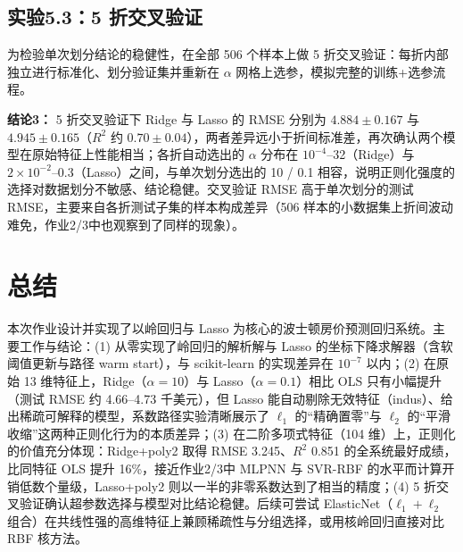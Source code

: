 \documentclass[UTF8,zihao=-4]{ctexart}
\newcommand{\mlExperiment}[2]{\subsection{实验#1：#2}}
\newcommand{\mlConclusion}[1]{\par\noindent\textbf{结论#1：}}
\begin{document}
\mlExperiment{5.3}{5 折交叉验证}
为检验单次划分结论的稳健性，在全部 506 个样本上做 5 折交叉验证：每折内部独立进行标准化、划分验证集并重新在 $\alpha$ 网格上选参，模拟完整的训练+选参流程。

\mlConclusion{3}
5 折交叉验证下 Ridge 与 Lasso 的 RMSE 分别为 $4.884\pm0.167$ 与 $4.945\pm0.165$（$R^2$ 约 $0.70\pm0.04$），两者差异远小于折间标准差，再次确认两个模型在原始特征上性能相当；各折自动选出的 $\alpha$ 分布在 $10^{-4}$--32（Ridge）与 $2\times10^{-2}$--0.3（Lasso）之间，与单次划分选出的 10 / 0.1 相容，说明正则化强度的选择对数据划分不敏感、结论稳健。交叉验证 RMSE 高于单次划分的测试 RMSE，主要来自各折测试子集的样本构成差异（506 样本的小数据集上折间波动难免，作业2/3中也观察到了同样的现象）。

\section{总结}
本次作业设计并实现了以岭回归与 Lasso 为核心的波士顿房价预测回归系统。主要工作与结论：(1) 从零实现了岭回归的解析解与 Lasso 的坐标下降求解器（含软阈值更新与路径 warm start），与 scikit-learn 的实现差异在 $10^{-7}$ 以内；(2) 在原始 13 维特征上，Ridge（$\alpha=10$）与 Lasso（$\alpha=0.1$）相比 OLS 只有小幅提升（测试 RMSE 约 4.66--4.73 千美元），但 Lasso 能自动剔除无效特征（indus）、给出稀疏可解释的模型，系数路径实验清晰展示了 $\ell_1$ 的``精确置零''与 $\ell_2$ 的``平滑收缩''这两种正则化行为的本质差异；(3) 在二阶多项式特征（104 维）上，正则化的价值充分体现：Ridge+poly2 取得 RMSE 3.245、$R^2$ 0.851 的全系统最好成绩，比同特征 OLS 提升 16\%，接近作业2/3中 MLPNN 与 SVR-RBF 的水平而计算开销低数个量级，Lasso+poly2 则以一半的非零系数达到了相当的精度；(4) 5 折交叉验证确认超参数选择与模型对比结论稳健。后续可尝试 ElasticNet（$\ell_1+\ell_2$ 组合）在共线性强的高维特征上兼顾稀疏性与分组选择，或用核岭回归直接对比 RBF 核方法。
\end{document}
